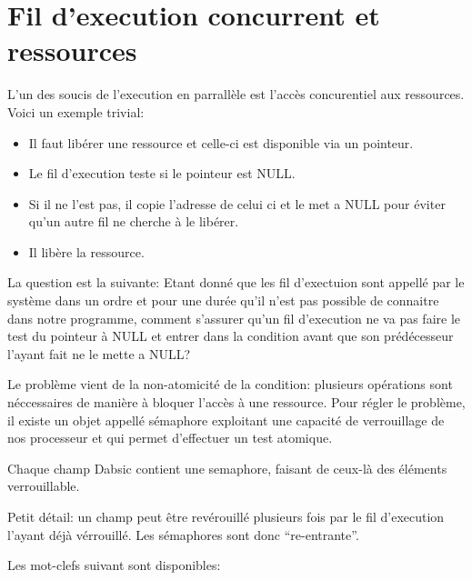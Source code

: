 \documentclass[a5paper, 12pt]{book}
\begin{document}
\chapter{Fil d'execution concurrent et ressources}

L'un des soucis de l'execution en parrallèle est l'accès concurentiel
aux ressources. Voici un exemple trivial:

\begin{itemize}
  \item Il faut libérer une ressource et celle-ci est disponible via
    un pointeur.
  \item Le fil d'execution teste si le pointeur est NULL.
  \item Si il ne l'est pas, il copie l'adresse de celui ci
    et le met a NULL pour éviter qu'un autre fil ne cherche
    à le libérer.
  \item Il libère la ressource.
\end{itemize}

La question est la suivante: Etant donné que les fil d'exectuion
sont appellé par le système dans un ordre et pour une durée qu'il
n'est pas possible de connaitre dans notre programme, comment
s'assurer qu'un fil d'execution ne va pas faire le test du pointeur
à NULL et entrer dans la condition avant que son prédécesseur
l'ayant fait ne le mette a NULL?

Le problème vient de la non-atomicité de la condition: plusieurs
opérations sont néccessaires de manière à bloquer l'accès à une
ressource. Pour régler le problème, il existe un objet appellé
sémaphore exploitant une capacité de verrouillage de nos processeur
et qui permet d'effectuer un test atomique.

Chaque champ Dabsic contient une semaphore, faisant de ceux-là
des éléments verrouillable.

Petit détail: un champ peut être revérouillé plusieurs
fois par le fil d'execution l'ayant déjà vérrouillé. Les sémaphores
sont donc ``re-entrante''.

Les mot-clefs suivant sont disponibles:
\end{document}
